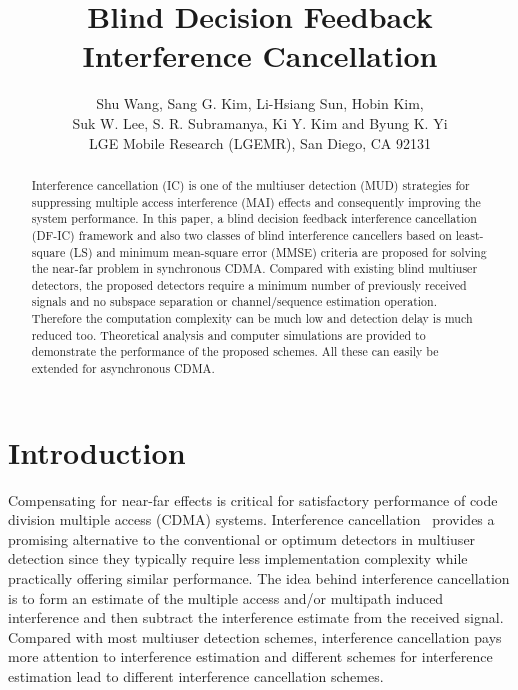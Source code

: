 \documentclass[a4paper,10pt,fleqn, twocolumn]{IEEETran}
\title{Blind Decision Feedback Interference Cancellation}
\author{Shu Wang, Sang G. Kim, Li-Hsiang Sun, Hobin Kim,\\
   Suk W. Lee, S. R. Subramanya, Ki Y. Kim and Byung K. Yi\\ LGE Mobile Research (LGEMR), San Diego, CA 92131}
\date{}
\begin{document}
\maketitle
\begin{abstract}\small
Interference cancellation (IC) is one of the multiuser detection
(MUD) strategies for suppressing multiple access interference
(MAI) effects and consequently improving the system performance.
In this paper, a blind decision feedback interference cancellation
(DF-IC) framework and also two classes of blind interference
cancellers based on least-square (LS) and minimum mean-square
error (MMSE) criteria are proposed for solving the near-far
problem in synchronous CDMA. Compared with existing blind
multiuser detectors, the proposed detectors require a minimum
number of previously received signals and no subspace separation
or channel/sequence estimation operation. Therefore the
computation complexity can be much low and detection delay is much
reduced too. Theoretical analysis and computer simulations are
provided to demonstrate the performance of the proposed schemes.
All these can easily be extended for asynchronous CDMA.
\end{abstract}
\section{Introduction}
Compensating for near-far effects is critical for satisfactory
performance of code division multiple access (CDMA) systems.
Interference
cancellation~\cite{Yoon93,Patel94,Wijk95,Divsalar96,Kim98,Bugallo01}
provides a promising alternative to the conventional or optimum
detectors in multiuser detection since they typically require less
implementation complexity while practically offering similar
performance. The idea behind interference cancellation is to form
an estimate of the multiple access and/or multipath induced
interference and then subtract the interference estimate from the
received signal. Compared with most multiuser detection schemes,
interference cancellation pays more attention to interference
estimation and different schemes for interference estimation lead
to different interference cancellation schemes.
\end{document}
